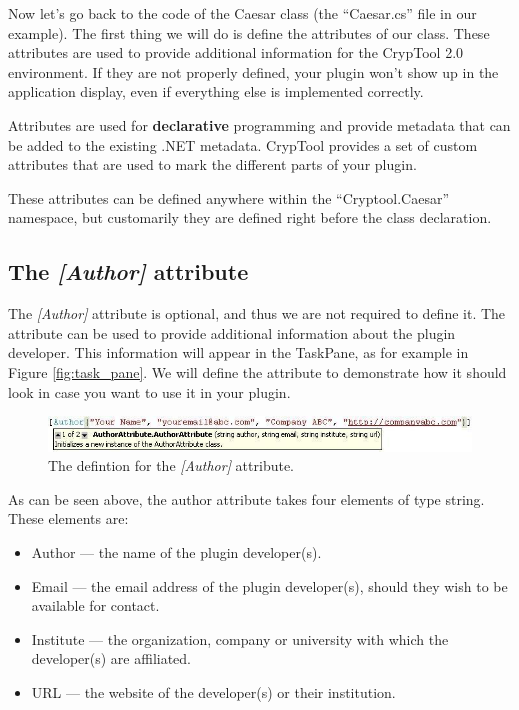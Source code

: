 Now let's go back to the code of the Caesar class (the ``Caesar.cs'' file in our example). The first thing we will do is define the attributes of our class. These attributes are used to provide additional information for the CrypTool 2.0 environment. If they are not properly defined, your plugin won't show up in the application display, even if everything else is implemented correctly.

Attributes are used for \textbf{declarative} programming and provide metadata that can be added to the existing .NET metadata. CrypTool provides a set of custom attributes that are used to mark the different parts of your plugin.

These attributes can be defined anywhere within the ``Cryptool.Caesar'' namespace, but customarily they are defined right before the class declaration.

\subsection{The \protect\textit{[Author]} attribute}
\label{sec:TheAuthorAttribute}

The \textit{[Author]} attribute is optional, and thus we are not required to define it. The attribute can be used to provide additional information about the plugin developer. This information will appear in the TaskPane, as for example in Figure \ref{fig:task_pane}. We will define the attribute to demonstrate how it should look in case you want to use it in your plugin.

\begin{figure}[h!]
	\centering
		\includegraphics[width=.90\textwidth]{figures/attribute_author_new.jpg}
	\caption{The defintion for the \textit{[Author]} attribute.}
	\label{fig:attribute_author}
\end{figure}

As can be seen above, the author attribute takes four elements of type string. These elements are:

\begin{itemize}
	\item Author --- the name of the plugin developer(s).
	\item Email --- the email address of the plugin developer(s), should they wish to be available for contact.
	\item Institute --- the organization, company or university with which the developer(s) are affiliated.
	\item URL --- the website of the developer(s) or their institution.
\end{itemize}

